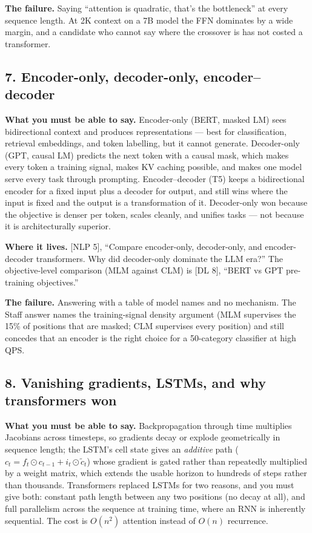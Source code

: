 \textbf{The failure.} Saying ``attention is quadratic, that's the bottleneck'' at every sequence length. At 2K context on a 7B model the FFN dominates by a wide margin, and a candidate who cannot say where the crossover is has not costed a transformer.

\subsection*{7. Encoder-only, decoder-only, encoder--decoder}

\textbf{What you must be able to say.} Encoder-only (BERT, masked LM) sees bidirectional context and produces representations --- best for classification, retrieval embeddings, and token labelling, but it cannot generate. Decoder-only (GPT, causal LM) predicts the next token with a causal mask, which makes every token a training signal, makes KV caching possible, and makes one model serve every task through prompting. Encoder--decoder (T5) keeps a bidirectional encoder for a fixed input plus a decoder for output, and still wins where the input is fixed and the output is a transformation of it. Decoder-only won because the objective is denser per token, scales cleanly, and unifies tasks --- not because it is architecturally superior.

\textbf{Where it lives.} [NLP 5], ``Compare encoder-only, decoder-only, and encoder-decoder transformers. Why did decoder-only dominate the LLM era?'' The objective-level comparison (MLM against CLM) is [DL 8], ``BERT vs GPT pre-training objectives.''

\textbf{The failure.} Answering with a table of model names and no mechanism. The Staff answer names the training-signal density argument (MLM supervises the 15\% of positions that are masked; CLM supervises every position) and still concedes that an encoder is the right choice for a 50-category classifier at high QPS.

\subsection*{8. Vanishing gradients, LSTMs, and why transformers won}

\textbf{What you must be able to say.} Backpropagation through time multiplies Jacobians across timesteps, so gradients decay or explode geometrically in sequence length; the LSTM's cell state gives an \emph{additive} path ($c_t = f_t \odot c_{t-1} + i_t \odot \tilde{c}_t$) whose gradient is gated rather than repeatedly multiplied by a weight matrix, which extends the usable horizon to hundreds of steps rather than thousands. Transformers replaced LSTMs for two reasons, and you must give both: constant path length between any two positions (no decay at all), and full parallelism across the sequence at training time, where an RNN is inherently sequential. The cost is $O(n^2)$ attention instead of $O(n)$ recurrence.

